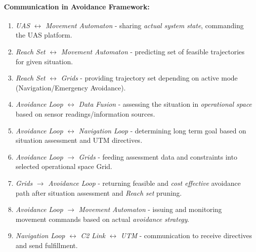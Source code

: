 \paragraph{Communication in Avoidance Framework:}
\begin{enumerate}
    \item \emph{UAS $\leftrightarrow$ Movement Automaton} - sharing \emph{actual system state}, commanding the UAS platform.
    
    \item \emph{Reach Set $\leftrightarrow$ Movement Automaton} - predicting set of feasible trajectories for given situation.
    
    \item \emph{Reach Set $\leftrightarrow$ Grids} - providing trajectory set depending on active mode (Navigation/Emergency Avoidance).
    
    \item \emph{Avoidance Loop $\leftrightarrow$ Data Fusion} - assessing the situation in \emph{operational space} based on sensor readings/information sources.
    
    \item \emph{Avoidance Loop $\leftrightarrow$ Navigation Loop} - determining long term goal based on situation assessment and UTM directives. 
    
    \item \emph{Avoidance Loop $\to$ Grids} - feeding assessment data and constraints into selected operational space Grid.
    
    \item \emph{Grids $\to$ Avoidance Loop} - returning feasible and \emph{cost effective} avoidance path after situation assessment and \emph{Reach set} pruning.
    
    \item \emph{Avoidance Loop $\to$ Movement Automaton} - issuing and monitoring movement commands based on actual \emph{avoidance strategy}.
    
    \item \emph{Navigation Loop $\leftrightarrow$ C2 Link $\leftrightarrow$ UTM} - communication to receive directives and send fulfillment. 
\end{enumerate}